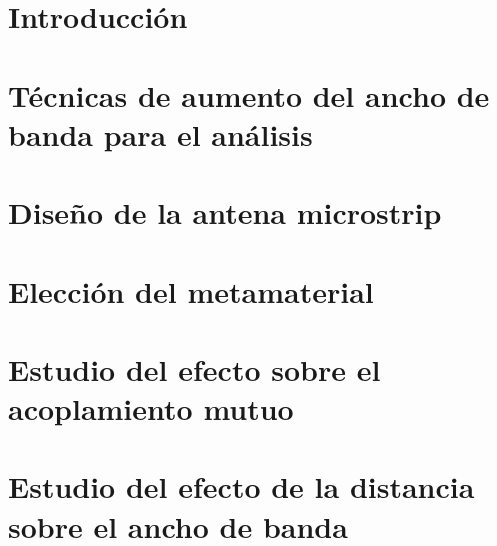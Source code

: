 
\section{Introducción}
\section{Técnicas de aumento del ancho de banda para el análisis}
\label{sec_aumento_bw}
\lipsum
\section{Diseño de la antena microstrip}
\label{sec_disenio_microstrip}
\lipsum
\section{Elección del metamaterial}
\label{sec_eleccion}
\lipsum
\section{Estudio del efecto sobre el acoplamiento mutuo}
\label{sec_estudio_acoplam_mutuo}
\lipsum
\section{Estudio del efecto de la distancia sobre el ancho de banda}
\label{sec_efecto_distancia}
\lipsum

